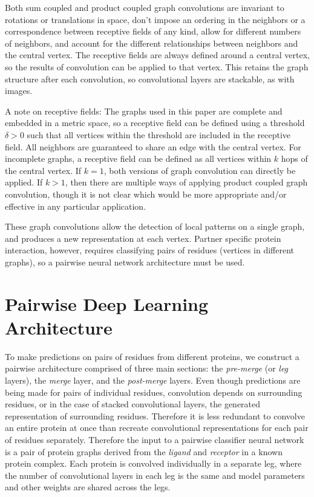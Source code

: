 Both sum coupled and product coupled graph convolutions are invariant to rotations or translations in space, don't impose an ordering in the neighbors or a correspondence between receptive fields of any kind, allow for different numbers of neighbors, and account for the different relationships between neighbors and the central vertex. 
The receptive fields are always defined around a central vertex, so the results of convolution can be applied to that vertex.
This retains the graph structure after each convolution, so convolutional layers are stackable, as with images.

A note on receptive fields: 
The graphs used in this paper are complete and embedded in a metric space, so a receptive field can be defined using a threshold $\delta>0$ such that all vertices within the threshold are included in the receptive field.
All neighbors are guaranteed to share an edge with the central vertex.
For incomplete graphs, a receptive field can be defined as all vertices within $k$ hops of the central vertex. 
If $k=1$, both versions of graph convolution can directly be applied.
If $k>1$, then there are multiple ways of applying product coupled graph convolution, though it is not clear which would be more appropriate and/or effective in any particular application.

These graph convolutions allow the detection of local patterns on a single graph, and produces a new representation at each vertex.
Partner specific protein interaction, however, requires classifying pairs of residues (vertices in different graphs), so a pairwise neural network architecture must be used. 

\section{Pairwise Deep Learning Architecture}
To make predictions on pairs of residues from different proteins, we construct a pairwise architecture comprised of three main sections: the \textit{pre-merge} (or \textit{leg} layers), the \textit{merge} layer, and the \textit{post-merge} layers. 
Even though predictions are being made for pairs of individual residues, convolution depends on surrounding residues, or in the case of stacked convolutional layers, the generated representation of surrounding residues.
Therefore it is less redundant to convolve an entire protein at once than recreate convolutional representations for each pair of residues separately. 
Therefore the input to a pairwise classifier neural network is a pair of protein graphs derived from the \textit{ligand} and \textit{receptor} in a known protein complex.
Each protein is convolved individually in a separate leg, where the number of convolutional layers in each leg is the same and model parameters and other weights are shared across the legs.

